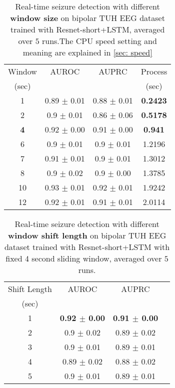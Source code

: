 \documentclass[pmlr,twocolumn,10pt]{jmlr}
\begin{document}
\begin{table}[h!]
    \small
	\centering
	\caption{Real-time seizure detection with different \textbf{window size} on bipolar TUH EEG dataset trained with Resnet-short+LSTM, averaged over $5$ runs.The CPU speed setting and meaning are explained in \ref{sec: speed}}
	\label{windowsize_resnetlstm}
	\begin{tabular}{c|ccc}
		\toprule
		Window & AUROC & AUPRC & Process\\
		(sec) &&& (sec)\\
		\midrule
		1 & 0.89 $\pm$ 0.01 & 0.88 $\pm$ 0.01 & \textbf{0.2423} \\
		2  & 0.9 $\pm$ 0.01 & 0.86 $\pm$ 0.06 & \textbf{0.5178} \\
		\textbf{4} & 0.92 $\pm$ 0.00 & 0.91 $\pm$ 0.00 & \textbf{0.941}\\
		6  & 0.9 $\pm$ 0.01 & 0.9 $\pm$ 0.01 & 1.2196 \\
		7  & 0.91 $\pm$ 0.01 & 0.9 $\pm$ 0.01 & 1.3012 \\
		8  & 0.9 $\pm$ 0.02 & 0.9 $\pm$ 0.00 & 1.3785 \\
		10  & 0.93 $\pm$ 0.01 & 0.92 $\pm$ 0.01 & 1.9242 \\
		12  & 0.92 $\pm$ 0.01 & 0.91 $\pm$ 0.01  & 2.0114 \\
		\bottomrule
	\end{tabular}
\end{table} \begin{table}[h!]
	\small
	\centering
	\caption{Real-time seizure detection with different \textbf{window shift length} on bipolar TUH EEG dataset trained with Resnet-short+LSTM with fixed 4 second sliding window, averaged over $5$ runs.}
	\label{shift_resnetlstm}
	\begin{tabular}{c|ccc}\toprule
		Shift Length & AUROC & AUPRC \\
		(sec)\\
		\midrule
		1 & \textbf{0.92 $\pm$ 0.00} & \textbf{0.91 $\pm$ 0.00}\\
		2 & 0.9 $\pm$ 0.02 & 0.89 $\pm$ 0.02\\ 
		3 & 0.9 $\pm$ 0.01 & 0.89 $\pm$ 0.01\\
		4 & 0.89 $\pm$ 0.02 & 0.88 $\pm$ 0.02\\
		5 & 0.9 $\pm$ 0.01 & 0.89 $\pm$ 0.01\\
		\bottomrule
	\end{tabular}
\end{table}
\end{document}
